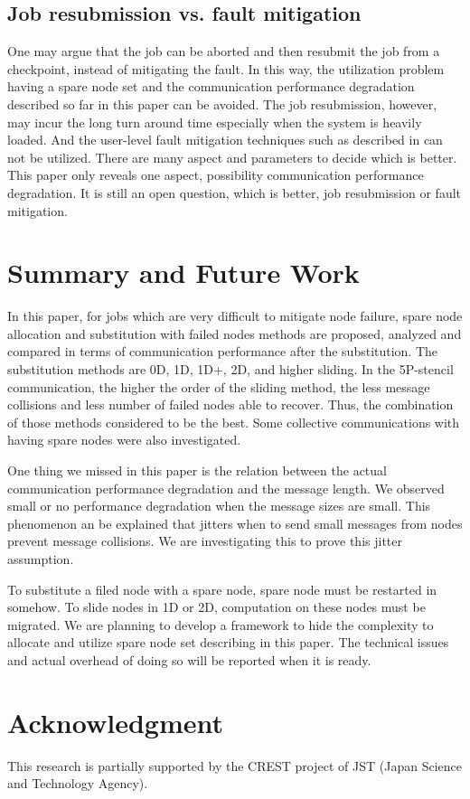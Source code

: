 \documentclass[10pt,conference,a4paper,fleqn]{IEEEtran}
\begin{document}
\subsection{Job resubmission vs. fault mitigation}

One may argue that the job can be aborted and then resubmit the job
from a checkpoint, instead of mitigating the fault. In this way, the
utilization problem having a spare node set and the communication
performance degradation described so far in this paper can be
avoided. The job resubmission, however, may incur the long turn around
time especially when the system is heavily loaded. And the user-level
fault mitigation techniques such as described in
\cite{Davies:2011:HPL:1995896.1995923} can not be utilized. There are
many aspect and parameters to decide which is better. This paper only
reveals one aspect, possibility communication performance
degradation. It is still an open question, which
is better, job resubmission or fault mitigation.

\section{Summary and Future Work}

In this paper, for jobs which are very difficult to mitigate node
failure, spare node allocation and substitution with failed 
nodes methods are proposed, analyzed and compared in terms of
communication performance after the substitution. The substitution
methods are 0D, 1D, 1D+, 2D, and higher sliding. In the 5P-stencil
communication, the higher the order of the sliding method, the less
message collisions and less number of failed nodes able to
recover. Thus, the combination of those methods considered to be the
best. Some collective communications with having spare nodes were also
investigated.

One thing we missed in this paper is the relation between the actual
communication performance degradation and the message length. We
observed small or no performance degradation when the message sizes
are small. This phenomenon an be explained that jitters when to send
small messages from nodes prevent message collisions. We are
investigating this to prove this jitter assumption.

To substitute a filed node with a spare node, spare node must be
restarted in somehow. To slide nodes in 1D or 2D, computation on these
nodes must be migrated. We are planning to develop a framework to hide
the complexity to allocate and utilize spare node set describing in
this paper. The technical issues and actual overhead of doing so will
be reported when it is ready. 

\section*{Acknowledgment}
This research is partially supported by the CREST project of
JST (Japan Science and Technology Agency).



\end{document}
